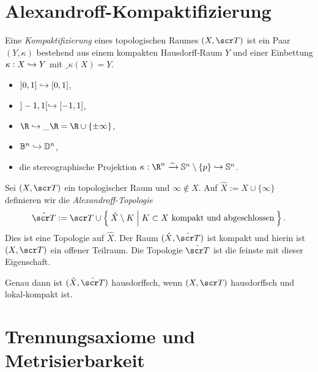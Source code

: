 \section{Alexandroff-Kompaktifizierung}


\begin{df}
	Eine \emph{Kompaktifizierung} eines topologischen Raumes $(X, \scr T)$ ist ein Paar $(Y, \kappa)$ bestehend aus einem kompakten Hausdorff-Raum $Y$ und einer Einbettung $\kappa: X \hookrightarrow Y$ mit $\_{\kappa(X)} = Y$.
\end{df}

\begin{ex}
	\begin{itemize}
		\item
			$]0,1] \hookrightarrow [0,1]$,
		\item
			$]-1,1[ \hookrightarrow [-1,1]$,
		\item
			$\R \injto \_\R = \R \cup \{\pm\infty\}$,
		\item
			$\mathbb{B}^n \hookrightarrow \mathbb{D}^n$,
		\item
			die stereographische Projektion $\kappa: \R^n \homto \S^n \setminus \{p\} \injto \S^n$.
	\end{itemize}
\end{ex}

\begin{st}[Alexandroff]
	Sei $(X, \scr T)$ ein topologischer Raum und $\infty \not\in X$.
	Auf $\hat X := X \cup \{\infty\}$ definieren wir die \emph{Alexandroff-Topologie}
	\[
		\hat{\scr T} :=
		\scr T \cup \Set{ \hat X \setminus K | K \subset X \text{ kompakt und abgeschlossen} }.
	\]
	Dies ist eine Topologie auf $\hat X$.
	Der Raum $(\hat X, \hat{\scr T})$ ist kompakt und hierin ist $(X, \scr T)$ ein offener Teilraum.
	Die Topologie $\hat{\scr T}$ ist die feinste mit dieser Eigenschaft.

	Genau dann ist $(\hat X, \hat{\scr T})$ hausdorffsch, wenn $(X, \scr T)$ hausdorffsch und lokal-kompakt ist.
\end{st}


\section{Trennungsaxiome und Metrisierbarkeit}


